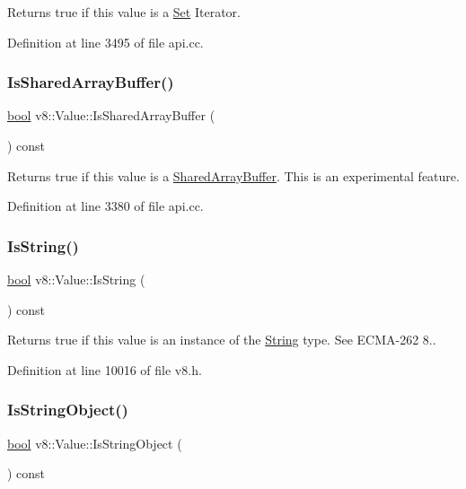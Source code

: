 Returns true if this value is a \mbox{\hyperlink{classv8_1_1Set}{Set}} Iterator. 

Definition at line 3495 of file api.\+cc.

\mbox{\label{classv8_1_1Value_a1d7d90fe704feab89dcbdc383ab298b2}} 
\subsubsection{\texorpdfstring{Is\+Shared\+Array\+Buffer()}{IsSharedArrayBuffer()}}
{\footnotesize\ttfamily \mbox{\hyperlink{classbool}{bool}} v8\+::\+Value\+::\+Is\+Shared\+Array\+Buffer (\begin{DoxyParamCaption}{ }\end{DoxyParamCaption}) const}

Returns true if this value is a \mbox{\hyperlink{classv8_1_1SharedArrayBuffer}{Shared\+Array\+Buffer}}. This is an experimental feature. 

Definition at line 3380 of file api.\+cc.

\mbox{\label{classv8_1_1Value_a6c7582919eec6f30e865b3300eff9a8e}} 
\subsubsection{\texorpdfstring{Is\+String()}{IsString()}}
{\footnotesize\ttfamily \mbox{\hyperlink{classbool}{bool}} v8\+::\+Value\+::\+Is\+String (\begin{DoxyParamCaption}{ }\end{DoxyParamCaption}) const}

Returns true if this value is an instance of the \mbox{\hyperlink{classv8_1_1String}{String}} type. See E\+C\+M\+A-\/262 8.. 

Definition at line 10016 of file v8.\+h.

\mbox{\label{classv8_1_1Value_a32054145eadf3b1a3f900dcd52110e2b}} 
\subsubsection{\texorpdfstring{Is\+String\+Object()}{IsStringObject()}}
{\footnotesize\ttfamily \mbox{\hyperlink{classbool}{bool}} v8\+::\+Value\+::\+Is\+String\+Object (\begin{DoxyParamCaption}{ }\end{DoxyParamCaption}) const}

